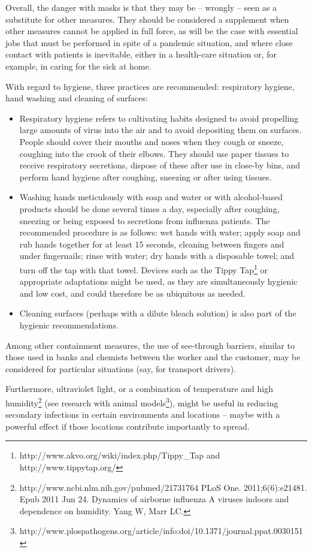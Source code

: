 \documentclass[12pt, a4]{scrartcl}
\begin{document}
Overall, the danger with masks is that they may be – wrongly – seen as a substitute for other measures. They should be considered a supplement when other measures cannot be applied in full force, as will be the case with essential jobs that must be performed in spite of a pandemic situation, and where close contact with patients is inevitable, either in a health-care situation or, for example, in caring for the sick at home.

With regard to hygiene, three practices are recommended: respiratory hygiene, hand washing and cleaning of surfaces:
\begin{itemize}
	\item Respiratory hygiene refers to cultivating habits designed to avoid propelling large amounts of virus into the air and to avoid depositing them on surfaces. People should cover their mouths and noses when they cough or sneeze, coughing into the crook of their elbows. They should use paper tissues to receive respiratory secretions, dispose of these after use in close-by bins, and perform hand hygiene after coughing, sneezing or after using tissues.
	\item Washing hands meticulously with soap and water or with alcohol-based products should be done several times a day, especially after coughing, sneezing or being exposed to secretions from influenza patients. The recommended procedure is as follows: wet hands with water; apply soap and rub hands together for at least 15 seconds, cleaning between fingers and under fingernails; rinse with water; dry hands with a disposable towel; and turn off the tap with that towel. Devices such as the Tippy Tap\footnote{http://www.akvo.org/wiki/index.php/Tippy_Tap and http://www.tippytap.org/} or appropriate adaptations might be used, as they are simultaneously hygienic and low cost, and could therefore be as ubiquitous as needed.
	\item Cleaning surfaces (perhaps with a dilute bleach solution) is also part of the hygienic recommendations.
\end{itemize}

Among other containment measures, the use of see-through barriers, similar to those used in banks and chemists between the worker and the customer, may be considered for particular situations (say, for transport drivers).

Furthermore, ultraviolet light, or a combination of temperature and high humidity\footnote{ http://www.ncbi.nlm.nih.gov/pubmed/21731764 PLoS One. 2011;6(6):e21481. Epub 2011 Jun 24. Dynamics of airborne influenza A viruses indoors and dependence on humidity. Yang W, Marr LC.} (see research with animal models\footnote{http://www.plospathogens.org/article/info:doi/10.1371/journal.ppat.0030151}), might be useful in reducing secondary infections in certain environments and locations – maybe with a powerful effect if those locations contribute importantly to spread.
\end{document}
